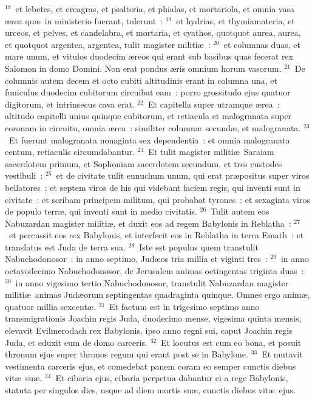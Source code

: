 ${}^{18}$~et lebetes, et creagras, et psalteria, et phialas, et mortariola, et omnia vasa \ae rea qu\ae\ in ministerio fuerant, tulerunt~:
${}^{19}$~et hydrias, et thymiamateria, et urceos, et pelves, et candelabra, et mortaria, et cyathos, quotquot aurea, aurea, et quotquot argentea, argentea, tulit magister militi\ae~:
${}^{20}$~et columnas duas, et mare unum, et vitulos duodecim \ae reos qui erant sub basibus quas fecerat rex Salomon in domo Domini. Non erat pondus \ae ris omnium horum vasorum.
${}^{21}$~De columnis autem decem et octo cubiti altitudinis erant in columna una, et funiculus duodecim cubitorum circuibat eam~: porro grossitudo ejus quatuor digitorum, et intrinsecus cava erat.
${}^{22}$~Et capitella super utramque \ae rea~: altitudo capitelli unius quinque cubitorum, et retiacula et malogranata super coronam in circuitu, omnia \ae rea~: similiter column\ae\ secund\ae , et malogranata.
${}^{23}$~Et fuerunt malogranata nonaginta sex dependentia~: et omnia malogranata centum, retiaculis circumdabantur.
${}^{24}$~Et tulit magister militi\ae\ Saraiam sacerdotem primum, et Sophoniam sacerdotem secundum, et tres custodes vestibuli~:
${}^{25}$~et de civitate tulit eunuchum unum, qui erat pr\ae positus super viros bellatores~: et septem viros de his qui videbant faciem regis, qui inventi sunt in civitate~: et scribam principem militum, qui probabat tyrones~: et sexaginta viros de populo terr\ae , qui inventi sunt in medio civitatis.
${}^{26}$~Tulit autem eos Nabuzardan magister militi\ae , et duxit eos ad regem Babylonis in Reblatha~:
${}^{27}$~et percussit eos rex Babylonis, et interfecit eos in Reblatha in terra Emath~: et translatus est Juda de terra sua.
${}^{28}$~Iste est populus quem transtulit Nabuchodonosor~: in anno septimo, Jud\ae os tria millia et viginti tres~:
${}^{29}$~in anno octavodecimo Nabuchodonosor, de Jerusalem animas octingentas triginta duas~:
${}^{30}$~in anno vigesimo tertio Nabuchodonosor, transtulit Nabuzardan magister militi\ae\ animas Jud\ae orum septingentas quadraginta quinque. Omnes ergo anim\ae , quatuor millia sexcent\ae .
${}^{31}$~Et factum est in trigesimo septimo anno transmigrationis Joachin regis Juda, duodecimo mense, vigesima quinta mensis, elevavit Evilmerodach rex Babylonis, ipso anno regni sui, caput Joachin regis Juda, et eduxit eum de domo carceris.
${}^{32}$~Et locutus est cum eo bona, et posuit thronum ejus super thronos regum qui erant post se in Babylone.
${}^{33}$~Et mutavit vestimenta carceris ejus, et comedebat panem coram eo semper cunctis diebus vit\ae\ su\ae .
${}^{34}$~Et cibaria ejus, cibaria perpetua dabantur ei a rege Babylonis, statuta per singulos dies, usque ad diem mortis su\ae , cunctis diebus vit\ae\ ejus.
